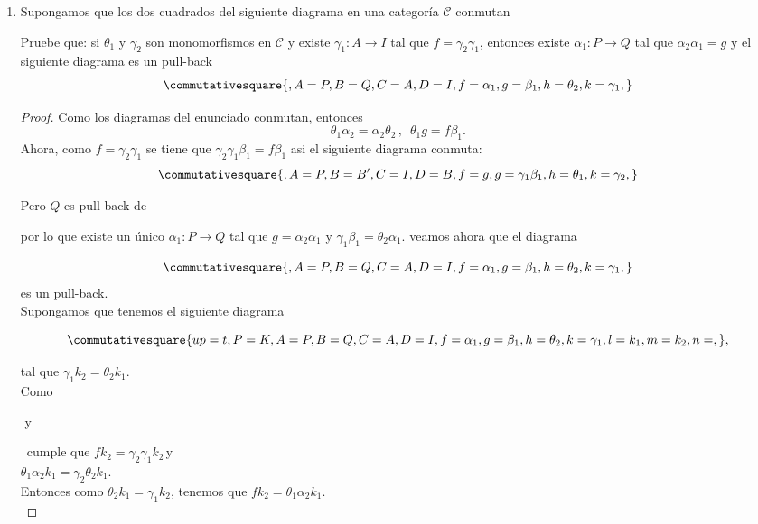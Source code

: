 \documentclass{article}
\begin{document}
\begin{enumerate}[label=\textbf{Ej \arabic*.}]
\item Supongamos que los dos cuadrados del siguiente diagrama en una categoría $\mathscr{C}$ conmutan\\
\centerline{}
Pruebe que: si $\theta_1$ y $\gamma_2$ son monomorfismos en $\mathscr{C}$ y existe $\gamma_1\colon A\longrightarrow I$ 
tal que $f=\gamma_2\gamma_1$, entonces existe $\alpha_1\colon P\rightarrow Q$ tal que $\alpha_2\alpha_1=g$ y el siguiente diagrama es un pull-back
\begin{equation*}
\commutativesquare{,A=P,B=Q,C=A,D=I, f=\alpha_1,g=\beta_1,h=\theta_2,k=\gamma_1,}
\end{equation*}	
\begin{proof}
Como los diagramas del enunciado conmutan, entonces
 \[\theta_1\alpha_2=\alpha_2\theta_2\,,\,\,\, \theta_1 g=f\beta_1.\]
Ahora, como $f=\gamma_2\gamma_1$ se tiene que $\gamma_2\gamma_1\beta_1=f\beta_1$ asi el siguiente diagrama conmuta:\\
\begin{equation*}
\commutativesquare{,A=P,B=B',C=I,D=B, f=g,g=\gamma_1\beta_1,h=\theta_1,k=\gamma_2,}
\end{equation*}	

Pero $Q$ es pull-back de 
por lo que existe un único $\alpha_1\colon P\longrightarrow Q$ tal que 
$g=\alpha_2\alpha_1$\,\,y\,\,$\gamma_1\beta_1=\theta_2\alpha_1.$ veamos ahora que el diagrama 

\begin{equation*}
\commutativesquare{,A=P,B=Q,C=A,D=I, f=\alpha_1,g=\beta_1,h=\theta_2,k=\gamma_1,}
\end{equation*}	
es un pull-back.\\

Supongamos que tenemos el siguiente diagrama 

\begin{equation*}
\commutativesquare{up=t,P=K,A=P,B=Q,C=A,D=I,f=\alpha_1,g=\beta_1,h=\theta_2,k=\gamma_1,l=k_1,m=k_2,n=,},
\end{equation*}

tal que $\gamma_1k_2=\theta_2k_1$. \\

Como  \,\,y\,\,\,
cumple que $fk_2=\gamma_2\gamma_1k_2\,$\quad y\\$ \theta_1\alpha_2k_1=\gamma_2\theta_2k_1$.\\
Entonces como $\theta_2k_1=\gamma_1k_2$, tenemos que $fk_2=\theta_1\alpha_2k_1$.\\


\end{proof}
\end{enumerate}
\end{document}
